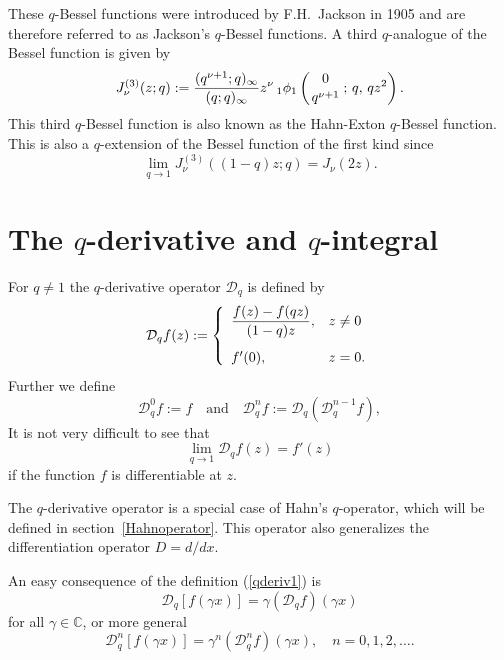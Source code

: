\documentclass[envcountchap,graybox]{svmono}
\newcommand{\qhyp}[5]{\mbox{}_{#1}{\phi}_{#2}
\left(\genfrac{}{}{0pt}{}{#3}{#4}\,;\,q,\,#5\right)}
\begin{document}
These $q$-Bessel functions were introduced by F.H.~Jackson in 1905 and
are therefore referred to as Jackson's $q$-Bessel functions. A third
$q$-analogue of the Bessel function is given by
\begin{equation}
\label{qBessel3}
J_{\nu}^{(3)}(z;q):=\frac{(q^{\nu+1};q)_{\infty}}{(q;q)_{\infty}}
z^{\nu}\,\qhyp{1}{1}{0}{q^{\nu+1}}{qz^2}.
\end{equation}
This third $q$-Bessel function is also known as the Hahn-Exton $q$-Bessel function.
This is also a $q$-extension of the Bessel function of the first kind since
$$\lim\limits_{q\rightarrow 1}J_{\nu}^{(3)}((1-q)z;q)=J_{\nu}(2z).$$

\section{The $q$-derivative and $q$-integral}
\par\setcounter{equation}{0}
\label{qderivative}

For $q\neq 1$ the $q$-derivative operator $\mathcal{D}_q$ is defined by
\begin{equation}
\label{qderiv1}\index{q-Derivative operator@$q$-Derivative operator}
\mathcal{D}_qf(z):=\left\{\begin{array}{ll}
\displaystyle \frac{f(z)-f(qz)}{(1-q)z}, & z\neq 0\\[5mm]
f'(0), & z=0.\end{array}\right.
\end{equation}
Further we define
\begin{equation}
\label{qderiv2}
\mathcal{D}_q^0f:=f\quad\textrm{and}\quad
\mathcal{D}_q^nf:=\mathcal{D}_q\left(\mathcal{D}_q^{n-1}f\right),
\end{equation}
It is not very difficult to see that
$$\lim\limits_{q\rightarrow 1}\mathcal{D}_qf(z)=f'(z)$$
if the function $f$ is differentiable at $z$.

The $q$-derivative operator is a special case of Hahn's $q$-operator, which will be defined in
section~\ref{Hahnoperator}. This operator also generalizes the differentiation operator $D=d/dx$.

An easy consequence of the definition (\ref{qderiv1}) is
\begin{equation}
\label{qderiv3}
\mathcal{D}_q\left[f(\gamma x)\right]=\gamma\left(\mathcal{D}_qf\right)(\gamma x)
\end{equation}
for all $\gamma\in\mathbb{C}$, or more general
\begin{equation}
\label{qderiv4}
\mathcal{D}_q^n\left[f(\gamma x)\right]=\gamma^n\left(\mathcal{D}_q^nf\right)(\gamma x),
\quad n=0,1,2,\ldots.
\end{equation}
\end{document}
